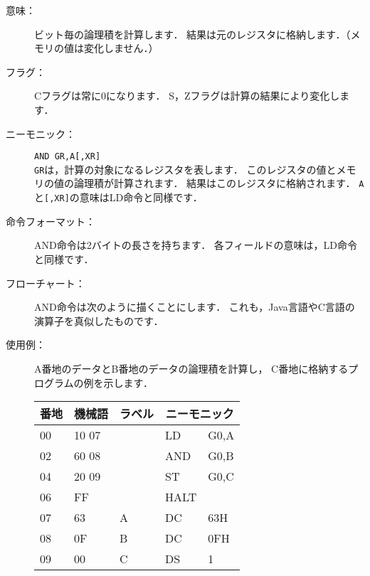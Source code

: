 \begin{description}
\item[意味：]ビット毎の論理積を計算します．
結果は元のレジスタに格納します．（メモリの値は変化しません．）

\item[フラグ：]Cフラグは常に0になります．
S，Zフラグは計算の結果により変化します．

\item[ニーモニック：]{\tt AND  GR,A[,XR]} \\
{\tt GR}は，計算の対象になるレジスタを表します．
このレジスタの値とメモリの値の論理積が計算されます．
結果はこのレジスタに格納されます．
{\tt A}と{\tt [,XR]}の意味はLD命令と同様です．

\item[命令フォーマット：]AND命令は2バイトの長さを持ちます．
各フィールドの意味は，LD命令と同様です．


\item[フローチャート：]AND命令は次のように描くことにします．
これも，Java言語やC言語の演算子を真似したものです．

\begin{center}
\end{center}

\item[使用例：]
A番地のデータとB番地のデータの論理積を計算し，
C番地に格納するプログラムの例を示します．

{\tt\small\begin{center}
\begin{tabular}{|l|l|l|l l|} \hline
番地 & 機械語 & ラベル & \multicolumn{2}{|c|}{ニーモニック} \\
\hline
00 & 10 07 &   & LD   & G0,A \\
02 & 60 08 &   & AND  & G0,B \\
04 & 20 09 &   & ST   & G0,C \\
06 & FF    &   & HALT &      \\
07 & 63    & A & DC   & 63H  \\
08 & 0F    & B & DC   & 0FH  \\
09 & 00    & C & DS   & 1    \\
\hline
\end{tabular}
\end{center}}


\begin{center}
\end{center}

\end{description}


